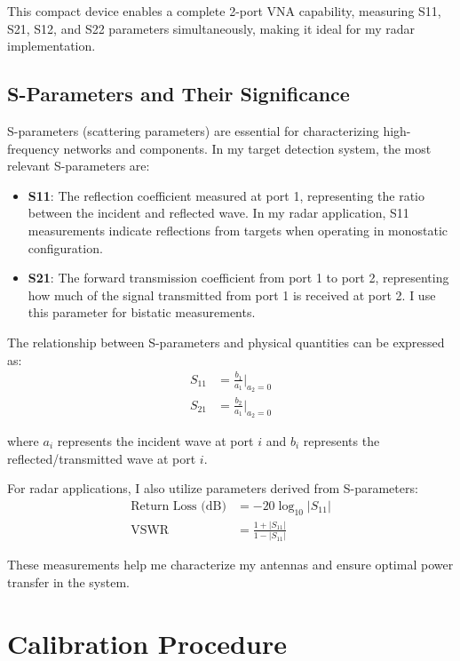 \documentclass[11pt,a4paper]{article}
\begin{document}
This compact device enables a complete 2-port VNA capability, measuring S11, S21, S12, and S22 parameters simultaneously, making it ideal for my radar implementation.

\subsection{S-Parameters and Their Significance}

S-parameters (scattering parameters) are essential for characterizing high-frequency networks and components. In my target detection system, the most relevant S-parameters are:

\begin{itemize}
    \item \textbf{S11}: The reflection coefficient measured at port 1, representing the ratio between the incident and reflected wave. In my radar application, S11 measurements indicate reflections from targets when operating in monostatic configuration.
    
    \item \textbf{S21}: The forward transmission coefficient from port 1 to port 2, representing how much of the signal transmitted from port 1 is received at port 2. I use this parameter for bistatic measurements.
\end{itemize}

The relationship between S-parameters and physical quantities can be expressed as:
\begin{align}
    S_{11} &= \frac{b_1}{a_1}|_{a_2=0} \\
    S_{21} &= \frac{b_2}{a_1}|_{a_2=0}
\end{align}

where $a_i$ represents the incident wave at port $i$ and $b_i$ represents the reflected/transmitted wave at port $i$.

For radar applications, I also utilize parameters derived from S-parameters:
\begin{align}
    \text{Return Loss (dB)} &= -20\log_{10}|S_{11}| \\
    \text{VSWR} &= \frac{1+|S_{11}|}{1-|S_{11}|}
\end{align}

These measurements help me characterize my antennas and ensure optimal power transfer in the system.

\section{Calibration Procedure}
\end{document}
